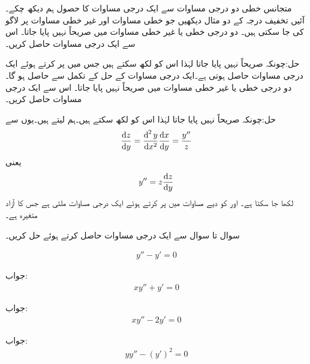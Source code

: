 متجانس خطی دو درجی مساوات سے ایک درجی مساوات کا حصول ہم دیکھ چکے۔ آئیں تخفیف درجہ کے دو مثال دیکھیں جو خطی مساوات اور غیر خطی مساوات پر لاگو کی جا سکتی ہیں۔
دو درجی خطی یا غیر خطی مساوات  میں  صریحاً نہیں پایا جاتا۔ اس سے ایک درجی مساوات حاصل کریں۔

حل:چونکہ  صریحاً نہیں پایا جاتا لہٰذا اس کو  لکھ سکتے ہیں جس میں  پر کرتے ہوئے ایک درجی مساوات  حاصل ہوتی ہے۔ایک درجی مساوات کے حل کے تکمل سے  حاصل ہو گا۔
دو درجی خطی یا غیر خطی مساوات  میں  صریحاً نہیں پایا جاتا۔ اس سے ایک درجی مساوات حاصل کریں۔

حل:چونکہ  صریحاً نہیں پایا جاتا لہٰذا اس کو  لکھ سکتے ہیں۔ہم  لیتے ہیں۔یوں  سے
\begin{align*}
\frac{\dif z}{\dif y}=\frac{\dif^{\,2} y}{\dif x^2} \frac{\dif x}{\dif y}=\frac{y''}{z}
\end{align*}
یعنی
\begin{align*}
y''=z\frac{\dif z}{\dif y}
\end{align*}
لکھا جا سکتا ہے۔ اور  کو دیے مساوات میں پر کرتے ہوئے ایک درجی مساوات  ملتی ہے جس کا آزاد متغیرہ  ہے۔

 \quad سوال  تا سوال  سے ایک درجی مساوات حاصل کرتے ہوئے حل کریں۔

\begin{align*}
y''-y'=0
\end{align*}

جواب:
\begin{align*}
xy''+y'=0
\end{align*}

جواب:
\begin{align*}
xy''-2y'=0
\end{align*}

جواب:
\begin{align*}
yy''-(y')^2=0
\end{align*}

